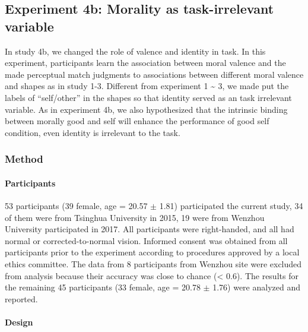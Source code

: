 \documentclass[
  english,
  man]{apa6}
\let\oldparagraph\paragraph
\renewcommand{\paragraph}[1]{\oldparagraph{#1}\mbox{}}
\begin{document}
\hypertarget{experiment-4b-morality-as-task-irrelevant-variable}{%
\subsection{Experiment 4b: Morality as task-irrelevant variable}\label{experiment-4b-morality-as-task-irrelevant-variable}}

In study 4b, we changed the role of valence and identity in task. In this experiment, participants learn the association between moral valence and the made perceptual match judgments to associations between different moral valence and shapes as in study 1-3. Different from experiment 1 \textasciitilde{} 3, we made put the labels of ``self/other'' in the shapes so that identity served as an task irrelevant variable. As in experiment 4b, we also hypothesized that the intrinsic binding between morally good and self will enhance the performance of good self condition, even identity is irrelevant to the task.

\hypertarget{method-7}{%
\subsubsection{Method}\label{method-7}}

\hypertarget{participants-9}{%
\paragraph{Participants}\label{participants-9}}

53 participants (39 female, age = 20.57 \(\pm\) 1.81) participated the current study, 34 of them were from Tsinghua University in 2015, 19 were from Wenzhou University participated in 2017. All participants were right-handed, and all had normal or corrected-to-normal vision. Informed consent was obtained from all participants prior to the experiment according to procedures approved by a local ethics committee. The data from 8 participants from Wenzhou site were excluded from analysis because their accuracy was close to chance (\textless{} 0.6). The results for the remaining 45 participants (33 female, age = 20.78 \(\pm\) 1.76) were analyzed and reported.

\hypertarget{design-4}{%
\paragraph{Design}\label{design-4}}
\end{document}
